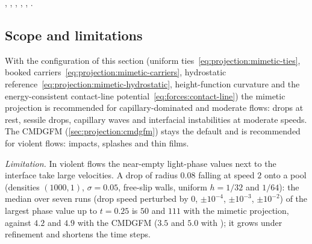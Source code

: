 \begin{implnote}
,
,
,
,
,
.
\end{implnote}

\subsection{Scope and limitations}\label{sec:projection:mimetic-scope}
With the configuration of this section (uniform
ties~\cref{eq:projection:mimetic-ties}, booked
carriers~\cref{eq:projection:mimetic-carriers}, hydrostatic
reference~\cref{eq:projection:mimetic-hydrostatic}, height-function
curvature and the energy-consistent contact-line
potential~\cref{eq:forces:contact-line}) the mimetic projection is
recommended for capillary-dominated and moderate flows: drops at rest, sessile
drops, capillary waves and interfacial instabilities at moderate speeds. The
CMDGFM (\cref{sec:projection:cmdgfm}) stays the default and is recommended for
violent flows: impacts, splashes and thin films.

\emph{Limitation.} In violent flows the near-empty light-phase values next to
the interface take large velocities. A drop of radius $0.08$ falling at speed
$2$ onto a pool (densities $(1000,1)$, $\sigma=0.05$, free-slip walls, uniform
$h=1/32$ and $1/64$): the median over seven runs (drop speed perturbed by $0$,
$\pm10^{-4}$, $\pm10^{-3}$, $\pm10^{-2}$) of the largest phase value up to
$t=0.25$ is $50$ and $111$ with the mimetic projection, against $4.2$ and $4.9$
with the CMDGFM ($3.5$ and $5.0$ with );
it grows under refinement and shortens the time steps.

